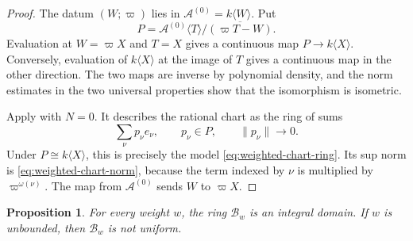 \documentclass[11pt,reqno]{amsart}
\newtheorem{proposition}[proposition]{Proposition}
\theoremstyle{definition}
\begin{document}
\begin{proof}
The datum $(W;\varpi)$ lies in
$\mathcal A^{(0)}=k\langle W\rangle$.  Put
\[
  P=
  \mathcal A^{(0)}\langle T\rangle/
  \overline{(\varpi T-W)}.
\]
Evaluation at $W=\varpi X$ and $T=X$ gives a continuous map
$P\to k\langle X\rangle$.  Conversely, evaluation of
$k\langle X\rangle$ at the image of $T$ gives a continuous map in the other
direction.  The two maps are inverse by polynomial density, and the norm
estimates in the two universal properties show that the isomorphism is
isometric.

Apply  with $N=0$.  It describes the
rational chart as the ring of sums
\[
  \sum_\nu p_\nu e_\nu,
  \qquad p_\nu\in P,\qquad \lVert p_\nu\rVert\longrightarrow0.
\]
Under $P\cong k\langle X\rangle$, this is precisely the model
\eqref{eq:weighted-chart-ring}.  Its sup norm is
\eqref{eq:weighted-chart-norm}, because the term indexed by $\nu$ is
multiplied by $\varpi^{\omega(\nu)}$.  The map from
$\mathcal A^{(0)}$ sends $W$ to $\varpi X$.
\end{proof}

\begin{proposition}\label{prop:weighted-chart-domain-nonuniform}
For every weight $w$, the ring $\mathcal B_w$ is an integral domain.  If $w$
is unbounded, then $\mathcal B_w$ is not uniform.
\end{proposition}
\end{document}
